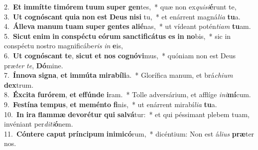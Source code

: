 {2.~}\textbf{Et} \textbf{im}\textbf{mít}\textbf{te} \textbf{ti}\textbf{mó}\textbf{rem} \textbf{tu}\textbf{um} \textbf{su}\textbf{per} \textbf{gen}tes,~* quæ non ex\textit{qui}\textit{si}\textbf{é}runt te,\\
{3.~}\textbf{Ut} \textbf{co}\textbf{gnó}\textbf{scant} \textbf{qui}\textbf{a} \textbf{non} \textbf{est} \textbf{De}\textbf{us} \textbf{ni}\textbf{si} tu,~* et enárrent magná\textit{li}\textit{a} \textbf{tu}a.\\
{4.~}\textbf{Ál}\textbf{le}\textbf{va} \textbf{ma}\textbf{num} \textbf{tu}\textbf{am} \textbf{su}\textbf{per} \textbf{gen}\textbf{tes} \textbf{a}\textbf{li}\textbf{é}nas,~* ut vídeant potén\textit{ti}\textit{am} \textbf{tu}am.\\
{5.~}\textbf{Si}\textbf{cut} \textbf{e}\textbf{nim} \textbf{in} \textbf{con}\textbf{spé}\textbf{ctu} \textbf{e}\textbf{ó}\textbf{rum} \textbf{san}\textbf{cti}\textbf{fi}\textbf{cá}\textbf{tus} \textbf{es} \textbf{in} \textbf{no}bis,~* sic in conspéctu nostro magnificábe\textit{ris} \textit{in} \textbf{e}is,\\
{6.~}\textbf{Ut} \textbf{co}\textbf{gnó}\textbf{scant} \textbf{te}, \textbf{si}\textbf{cut} \textbf{et} \textbf{nos} \textbf{co}\textbf{gnó}\textbf{vi}mus,~* quóniam non est Deus præ\textit{ter} \textit{te}, \textbf{Dó}mine.\\
{7.~}\textbf{Ín}\textbf{no}\textbf{va} \textbf{si}\textbf{gna}, \textbf{et} \textbf{im}\textbf{mú}\textbf{ta} \textbf{mi}\textbf{ra}\textbf{bí}\textbf{li}a.~* Glorífica manum, et brá\textit{chi}\textit{um} \textbf{dex}trum.\\
{8.~}\textbf{Éx}\textbf{ci}\textbf{ta} \textbf{fu}\textbf{ró}\textbf{rem}, \textbf{et} \textbf{ef}\textbf{fún}\textbf{de} \textbf{i}ram.~* Tolle adversárium, et afflíge \textit{i}\textit{ni}\textbf{mí}cum.\\
{9.~}\textbf{Fe}\textbf{stí}\textbf{na} \textbf{tem}\textbf{pus}, \textbf{et} \textbf{me}\textbf{mén}\textbf{to} \textbf{fi}nis,~* ut enárrent mirabí\textit{li}\textit{a} \textbf{tu}a.\\
{10.~}\textbf{In} \textbf{i}\textbf{ra} \textbf{flam}\textbf{mæ} \textbf{de}\textbf{vo}\textbf{ré}\textbf{tur} \textbf{qui} \textbf{sal}\textbf{vá}tur:~* et qui péssimant plebem tuam, invéniant per\textit{di}\textit{ti}\textbf{ó}nem.\\
{11.~}\textbf{Cón}\textbf{te}\textbf{re} \textbf{ca}\textbf{put} \textbf{prín}\textbf{ci}\textbf{pum} \textbf{i}\textbf{ni}\textbf{mi}\textbf{có}rum,~* dicéntium: Non est á\textit{li}\textit{us} \textbf{præ}ter nos.\\
